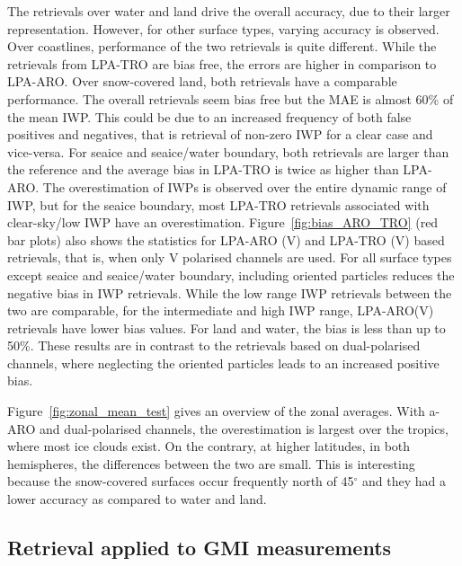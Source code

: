 \documentclass[amt, manuscript]{copernicus}
\begin{document}
The retrievals over water and land drive the overall accuracy, due to their larger representation. However, for other surface types, varying accuracy is observed. Over coastlines, performance of the two retrievals is quite different. While the retrievals from LPA-TRO are bias free, the errors are higher in comparison to LPA-ARO. Over snow-covered land, both retrievals have a comparable performance. The overall retrievals seem bias free but the MAE is almost 60\% of the mean IWP. This could be due to an increased frequency of both false positives and negatives, that is retrieval of non-zero IWP for a clear case and vice-versa. For seaice and seaice/water boundary, both retrievals are larger than the reference and the average bias in LPA-TRO is twice as higher than LPA-ARO. The overestimation of IWPs is observed over the entire dynamic range of IWP, but for the seaice boundary, most LPA-TRO retrievals associated with clear-sky/low IWP have an overestimation. Figure~\ref{fig:bias_ARO_TRO} (red bar plots) also shows the statistics for LPA-ARO (V) and LPA-TRO (V) based retrievals, that is, when only V polarised channels are used. For all surface types except seaice and seaice/water boundary, including oriented particles reduces the negative bias in IWP retrievals. While the low range IWP retrievals between the two are comparable, for the intermediate and high IWP range, LPA-ARO(V) retrievals have lower bias values. For land and water, the bias is less than up to 50\%. These results are in contrast to the retrievals based on dual-polarised channels, where neglecting the oriented particles leads to an increased positive bias.


Figure~\ref{fig:zonal_mean_test} gives an overview of the zonal averages. With a-ARO and dual-polarised channels, the overestimation is largest over the tropics, where most ice clouds exist. On the contrary, at higher latitudes, in both hemispheres, the differences between the two are small. This is interesting because the snow-covered surfaces occur frequently north of 45$^{\circ}$ and they had a lower accuracy as compared to water and land. 




\subsection{Retrieval applied to GMI measurements}
\label{sec:IWP_GMI}
\end{document}
